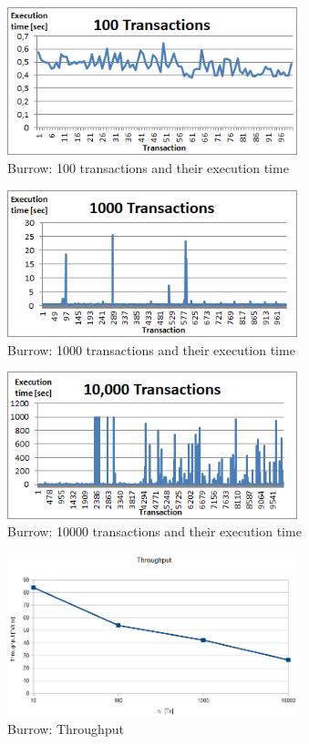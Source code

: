 \begin{figure}[!h]
    \centering
    \includegraphics[width=0.75\textwidth]{img/100Tx.png}
   \caption{Burrow: 100 transactions and their execution time}
   \label{fig:burrowtx100}
\end{figure}

\begin{figure}[!h]
    \centering
    \includegraphics[width=0.75\textwidth]{img/1000Tx.png}
   \caption{Burrow: 1000 transactions and their execution time}
   \label{fig:burrowtx1000}
\end{figure}

\begin{figure}[!h]
    \centering
    \includegraphics[width=0.75\textwidth]{img/10000Tx.png}
   \caption{Burrow: 10000 transactions and their execution time}
   \label{fig:burrowtx10000}
\end{figure}

\begin{figure}[!h]
    \centering
    \includegraphics[width=0.75\textwidth]{img/Hyperledger.png}
   \caption{Burrow: Throughput}
   \label{fig:burrowthroughput}
\end{figure}